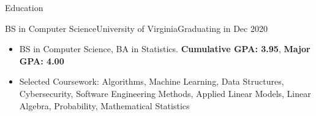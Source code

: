 \documentclass[]{mcdowellcv}
\begin{document}
\makeheader
      

\begin{cvsection}{Education}
	\begin{cvsubsection}{BS in Computer Science}{University of Virginia}{Graduating in Dec 2020}
		\begin{itemize}
			\item BS in Computer Science, BA in Statistics. \textbf{Cumulative GPA: 3.95}, \textbf{Major GPA: 4.00}
			\item Selected Coursework: Algorithms, Machine Learning, Data Structures, Cybersecurity, Software Engineering Methods, Applied Linear Models, Linear Algebra, Probability, Mathematical Statistics 
		\end{itemize}
	\end{cvsubsection}
\end{cvsection}
\end{document}
